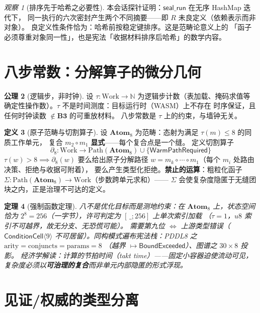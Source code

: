 \documentclass[11pt]{article}
\newtheorem{thm}{定理}[section]
\theoremstyle{definition}
\newtheorem{defn}[thm]{定义}
\newtheorem{axiom}[thm]{公理}
\theoremstyle{remark}
\newtheorem{obs}[thm]{观察}
\newcommand{\Hash}{\mathbf{B3}}
\newcommand{\Atom}{\mathbf{Atom}_8}
\begin{document}
\begin{obs}[排序先于哈希之必要性]
本会话探针证明：$\mathsf{seal\_run}$ 在无序 HashMap 迭代下，
同一执行的六次密封产生两个不同摘要——即 $R$ 未良定义（依赖表示而非对象）。
良定义性条件恰为：哈希前按稳定键排序。这是范畴论意义上的
「函子必须尊重对象同一性」，也是宪法「收据材料排序后哈希」的数学内容。
\end{obs}

\section{八步常数：分解算子的微分几何}

\begin{axiom}[逻辑步，非时钟]
设 $\tau : \mathrm{Work} \to \mathbb{N}$ 为逻辑步计数（表加载、掩码求值等
确定性操作数）。$\tau$ 不是时间测度：目标运行时（WASM）上不存在
时序保证，且任何时钟读数 $\notin \Hash$ 的可重放材料。
八步常数是 $\tau$ 上的约束，与墙钟无关。
\end{axiom}

\begin{defn}[原子范畴与切割算子]
设 $\Atom$ 为范畴：态射为满足 $\tau(m) \le 8$ 的同质工作单元，
复合 $m_2 \circ m_1$ \textbf{显式}——每个复合点是一个缝。
定义切割算子
\[
\partial_8 : \mathrm{Work} \to \mathrm{Path}(\Atom) \cup \{\mathsf{WarmPathRequired}\}
\]
$\tau(w) > 8 \implies \partial_8(w)$ 要么给出原子分解路径
$w = m_k \circ \cdots \circ m_1$（每个 $m_i$ 处路由决策、拒绝与收据可附着），
要么产生类型化拒绝。\textbf{禁止的运算}：粗粒化函子
$\Sigma : \mathrm{Path}(\Atom) \to \mathrm{Work}$（步数跨单元求和）——
$\Sigma$ 会使复杂度隐匿于无缝团块之内，正是治理不可达的定义。
\end{defn}

\begin{thm}[强制函数定理]
八不是优化目标而是测地约束：在 $\Atom$ 上，状态空间恰为
$2^8 = 256$（一字节），许可判定为 $[\,\_;256]$ 上单次索引加载
（$\tau = 1$，$u8$ 索引不可越界，故无分支、无恐慌可能）。
需要第九位 $\iff$ 上游类型错误（$\mathsf{ConditionCell}\langle 9\rangle$
不可居留）。同构模式遍布宪法栈：PDDL8 之
$\mathrm{arity} = \mathrm{conjuncts} = \mathrm{params} = 8$
（越界 $\mapsto \mathsf{BoundExceeded}$）、图谱之 $30 \times 8$ 投影。
经济学解读：计算的节拍时间（takt time）——固定小容器迫使流动可见，
复杂度必须以\textbf{可治理的复合}而非单元内部隐匿的形式浮现。
\end{thm}

\section{见证/权威的类型分离}
\end{document}
